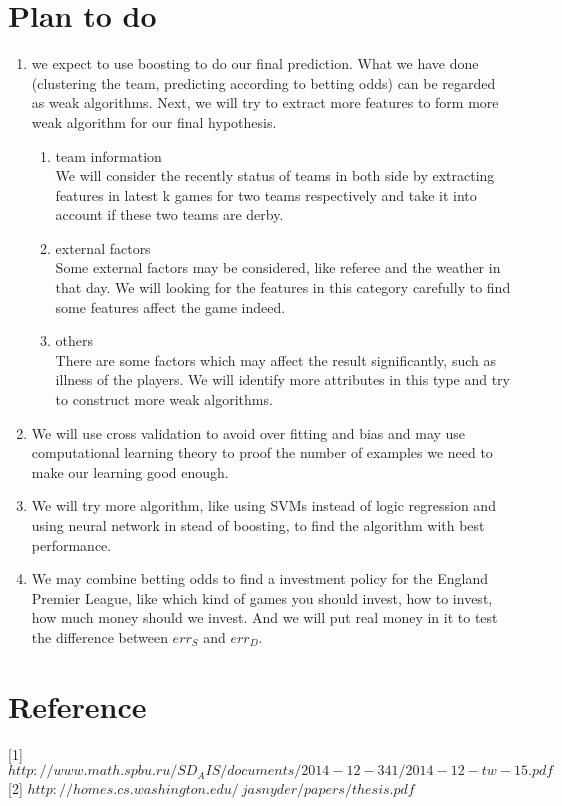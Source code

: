 \documentclass[a4paper,11pt,fleqn]{article}
\begin{document}
\section{Plan to do}
\begin{enumerate}
\item we expect to use boosting to do our final prediction. What we have done (clustering the team, predicting according to betting odds) can be regarded as weak algorithms. Next, we will try to extract more features to form more weak algorithm for our final hypothesis.

\begin{enumerate}
\item team information\\
We will consider the recently status of teams in both side by extracting features in latest k games for two teams respectively and take it into account if these two teams are derby. 
\item{external factors}\\
Some external factors may be considered, like referee and the weather in that day. We will looking for the features in this category carefully to find some features affect the game indeed.

\item{others}\\
There are some factors which may affect the result significantly, such as illness of the players. We will identify more attributes in this type and try to construct more weak algorithms.
\end{enumerate}

\item We will use cross validation to avoid over fitting and bias and may use computational learning theory to proof the number of examples we need to make our learning good enough.

\item We will try more algorithm, like using SVMs instead of logic regression and using neural network in stead of boosting, to find the algorithm with best performance.
\item We may combine betting odds to find a investment  policy for the England Premier League, like which kind of games you should invest, how to invest, how much money should we invest. And we will put real money in it to test the difference between $err_S$ and $err_D$.
\end{enumerate}

\section{Reference}
[1]
$http://www.math.spbu.ru/SD_AIS/documents/2014-12-341/2014-12-tw-15.pdf$
[2]
$http://homes.cs.washington.edu/~jasnyder/papers/thesis.pdf$
\end{document}
